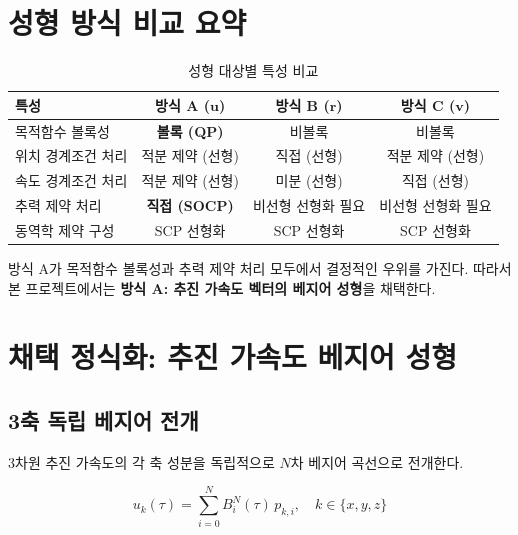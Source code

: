 \documentclass[11pt]{article}
\begin{document}
\section{성형 방식 비교 요약}

\begin{table}[h]
  \centering
  \caption{성형 대상별 특성 비교}
  \label{tab:comparison}
  \begin{tabular}{lccc}
    \toprule
    특성 & 방식 A ($\mathbf{u}$) & 방식 B ($\mathbf{r}$) & 방식 C ($\mathbf{v}$) \\
    \midrule
    목적함수 볼록성       & \textbf{볼록 (QP)} & 비볼록 & 비볼록 \\
    위치 경계조건 처리    & 적분 제약 (선형) & 직접 (선형) & 적분 제약 (선형) \\
    속도 경계조건 처리    & 적분 제약 (선형) & 미분 (선형) & 직접 (선형) \\
    추력 제약 처리        & \textbf{직접 (SOCP)} & 비선형 선형화 필요 & 비선형 선형화 필요 \\
    동역학 제약 구성      & SCP 선형화 & SCP 선형화 & SCP 선형화 \\
    \bottomrule
  \end{tabular}
\end{table}

방식 A가 목적함수 볼록성과 추력 제약 처리 모두에서 결정적인 우위를 가진다.
따라서 본 프로젝트에서는 \textbf{방식 A: 추진 가속도 벡터의 베지어 성형}을 채택한다.

\section{채택 정식화: 추진 가속도 베지어 성형}

\subsection{3축 독립 베지어 전개}

3차원 추진 가속도의 각 축 성분을 독립적으로 $N$차 베지어 곡선으로 전개한다.

\begin{equation}
  u_k(\tau) = \sum_{i=0}^{N} B_i^N(\tau)\, p_{k,i}, \quad k \in \{x, y, z\}
  \label{eq:u_components}
\end{equation}
\end{document}
